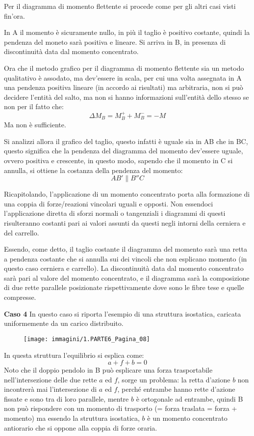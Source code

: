 \documentclass{article}
\begin{document}
\begin{adjustwidth}{2in}{}
 Per il diagramma di momento flettente si procede come per gli altri casi visti fin'ora. 
 
 In A il momento è sicuramente nullo, in più il taglio è positivo costante, quindi la pendenza del moneto sarà positiva e lineare. Si arriva in B, in presenza di discontinuità data dal momento concentrato. 
 
 Ora che il metodo grafico per il diagramma di momento flettente sia un metodo qualitativo è assodato, ma dev'essere in scala, per cui una volta assegnata in A una pendenza positiva lineare (in accordo ai risultati) ma arbitraria, non si può decidere l'entità del salto, ma non si hanno informazioni sull'entità dello stesso se non per il fatto che:
 \[\Delta M_B = M_B^+ + M_B^- = -M\]
 Ma non è sufficiente. 
 
 Si analizzi allora il grafico del taglio, questo infatti è uguale sia in AB che in BC, questo significa che la pendenza del diagramma del momento dev'essere uguale, ovvero positiva e crescente, in questo modo, sapendo che il momento in C si annulla, si ottiene la costanza della pendenza del momento:
\[ AB' \parallel B''C\]

	Ricapitolando, l'applicazione di un momento concentrato porta alla formazione di una coppia di forze/reazioni vincolari uguali e opposti. Non essendoci l'applicazione diretta di sforzi normali o tangenziali i diagrammi di questi risulteranno costanti pari ai valori assunti da questi negli intorni della cerniera e del carrello. 

	Essendo, come detto, il taglio costante il diagramma del momento sarà una retta a pendenza costante che si annulla sui dei vincoli che non esplicano momento (in questo caso cerniera e carrello). La discontinuità data dal momento concentrato sarà pari al valore del momento concentrato, e il diagramma sarà la composizione di due rette parallele posizionate rispettivamente dove sono le fibre tese e quelle compresse.    \newline 
	
\textbf{Caso 4} \newline
In questo caso si riporta l'esempio di una struttura isostatica, caricata uniformemente da un carico distribuito. 
 \begin{figure}[H]
	\centering
	\texttt{[image: immagini/1.PARTE6\_Pagina\_08]}
\end{figure}
	In questa struttura l'equilibrio si esplica come: 
\[a + f + b =0 \]
	Noto che il doppio pendolo in B può esplicare una forza trasportabile nell'intersezione delle due rette $a$ ed $f$, sorge un problema: la retta d'azione $b$ non incontrerà mai l'intersezione di $a$ ed $f$, perché entrambe hanno rette d'azione fissate e sono tra di loro parallele, mentre $b$ è ortogonale ad entrambe, quindi B non può rispondere con un momento di trasporto (= forza traslata = forza + momento) ma essendo la struttura isostatica, $b$ è un momento concentrato antiorario che si oppone alla coppia di forze oraria. 
	

\end{adjustwidth}
\end{document}
